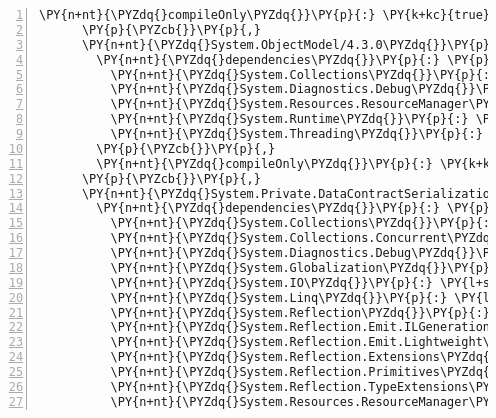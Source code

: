 \begin{Verbatim}[commandchars=\\\{\},numbers=left,firstnumber=1,stepnumber=1,numberblanklines=0]
        \PY{n+nt}{\PYZdq{}compileOnly\PYZdq{}}\PY{p}{:} \PY{k+kc}{true}
      \PY{p}{\PYZcb{}}\PY{p}{,}
      \PY{n+nt}{\PYZdq{}System.ObjectModel/4.3.0\PYZdq{}}\PY{p}{:} \PY{p}{\PYZob{}}
        \PY{n+nt}{\PYZdq{}dependencies\PYZdq{}}\PY{p}{:} \PY{p}{\PYZob{}}
          \PY{n+nt}{\PYZdq{}System.Collections\PYZdq{}}\PY{p}{:} \PY{l+s+s2}{\PYZdq{}4.3.0\PYZdq{}}\PY{p}{,}
          \PY{n+nt}{\PYZdq{}System.Diagnostics.Debug\PYZdq{}}\PY{p}{:} \PY{l+s+s2}{\PYZdq{}4.3.0\PYZdq{}}\PY{p}{,}
          \PY{n+nt}{\PYZdq{}System.Resources.ResourceManager\PYZdq{}}\PY{p}{:} \PY{l+s+s2}{\PYZdq{}4.3.0\PYZdq{}}\PY{p}{,}
          \PY{n+nt}{\PYZdq{}System.Runtime\PYZdq{}}\PY{p}{:} \PY{l+s+s2}{\PYZdq{}4.3.0\PYZdq{}}\PY{p}{,}
          \PY{n+nt}{\PYZdq{}System.Threading\PYZdq{}}\PY{p}{:} \PY{l+s+s2}{\PYZdq{}4.3.0\PYZdq{}}
        \PY{p}{\PYZcb{}}\PY{p}{,}
        \PY{n+nt}{\PYZdq{}compileOnly\PYZdq{}}\PY{p}{:} \PY{k+kc}{true}
      \PY{p}{\PYZcb{}}\PY{p}{,}
      \PY{n+nt}{\PYZdq{}System.Private.DataContractSerialization/4.3.0\PYZdq{}}\PY{p}{:} \PY{p}{\PYZob{}}
        \PY{n+nt}{\PYZdq{}dependencies\PYZdq{}}\PY{p}{:} \PY{p}{\PYZob{}}
          \PY{n+nt}{\PYZdq{}System.Collections\PYZdq{}}\PY{p}{:} \PY{l+s+s2}{\PYZdq{}4.3.0\PYZdq{}}\PY{p}{,}
          \PY{n+nt}{\PYZdq{}System.Collections.Concurrent\PYZdq{}}\PY{p}{:} \PY{l+s+s2}{\PYZdq{}4.3.0\PYZdq{}}\PY{p}{,}
          \PY{n+nt}{\PYZdq{}System.Diagnostics.Debug\PYZdq{}}\PY{p}{:} \PY{l+s+s2}{\PYZdq{}4.3.0\PYZdq{}}\PY{p}{,}
          \PY{n+nt}{\PYZdq{}System.Globalization\PYZdq{}}\PY{p}{:} \PY{l+s+s2}{\PYZdq{}4.3.0\PYZdq{}}\PY{p}{,}
          \PY{n+nt}{\PYZdq{}System.IO\PYZdq{}}\PY{p}{:} \PY{l+s+s2}{\PYZdq{}4.3.0\PYZdq{}}\PY{p}{,}
          \PY{n+nt}{\PYZdq{}System.Linq\PYZdq{}}\PY{p}{:} \PY{l+s+s2}{\PYZdq{}4.3.0\PYZdq{}}\PY{p}{,}
          \PY{n+nt}{\PYZdq{}System.Reflection\PYZdq{}}\PY{p}{:} \PY{l+s+s2}{\PYZdq{}4.3.0\PYZdq{}}\PY{p}{,}
          \PY{n+nt}{\PYZdq{}System.Reflection.Emit.ILGeneration\PYZdq{}}\PY{p}{:} \PY{l+s+s2}{\PYZdq{}4.3.0\PYZdq{}}\PY{p}{,}
          \PY{n+nt}{\PYZdq{}System.Reflection.Emit.Lightweight\PYZdq{}}\PY{p}{:} \PY{l+s+s2}{\PYZdq{}4.3.0\PYZdq{}}\PY{p}{,}
          \PY{n+nt}{\PYZdq{}System.Reflection.Extensions\PYZdq{}}\PY{p}{:} \PY{l+s+s2}{\PYZdq{}4.3.0\PYZdq{}}\PY{p}{,}
          \PY{n+nt}{\PYZdq{}System.Reflection.Primitives\PYZdq{}}\PY{p}{:} \PY{l+s+s2}{\PYZdq{}4.3.0\PYZdq{}}\PY{p}{,}
          \PY{n+nt}{\PYZdq{}System.Reflection.TypeExtensions\PYZdq{}}\PY{p}{:} \PY{l+s+s2}{\PYZdq{}4.3.0\PYZdq{}}\PY{p}{,}
          \PY{n+nt}{\PYZdq{}System.Resources.ResourceManager\PYZdq{}}\PY{p}{:} \PY{l+s+s2}{\PYZdq{}4.3.0\PYZdq{}}\PY{p}{,}

\end{Verbatim}
